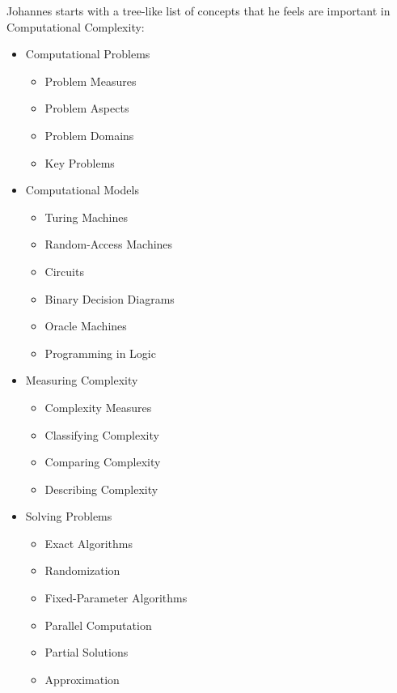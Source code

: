 Johannes starts with a tree-like list of concepts that he feels are important
in Computational Complexity:
%
\begin{itemize}
    \item Computational Problems
        \begin{itemize}\itemsep=0pt\parskip=0pt
            \item Problem Measures
            \item Problem Aspects
            \item Problem Domains
            \item Key Problems
        \end{itemize}
    \item Computational Models
        \begin{itemize}\itemsep=0pt\parskip=0pt
            \item Turing Machines
            \item Random-Access Machines
            \item Circuits
            \item Binary Decision Diagrams
            \item Oracle Machines
            \item Programming in Logic
        \end{itemize}
    \item Measuring Complexity
        \begin{itemize}\itemsep=0pt\parskip=0pt
            \item Complexity Measures
            \item Classifying Complexity
            \item Comparing Complexity
            \item Describing Complexity
        \end{itemize}
    \item Solving Problems
        \begin{itemize}\itemsep=0pt\parskip=0pt
            \item Exact Algorithms
            \item Randomization
            \item Fixed-Parameter Algorithms
            \item Parallel Computation
            \item Partial Solutions
            \item Approximation
        \end{itemize}
\end{itemize}


